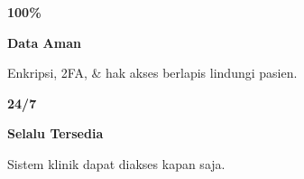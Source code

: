 \documentclass[a4paper]{article}
\begin{document}
\begin{minipage}[t]{0.485\textwidth}
    \noindent\colorbox{BlueBg}{%
        \begin{minipage}[t][2.7cm][c]{\dimexpr\linewidth-2\fboxsep\relax}
            \centering
            {\fontsize{20}{24}\selectfont\bfseries\color{BluePrimary} 100\%}\par\vspace{2pt}
            {\fontsize{9.5}{12}\selectfont\bfseries\color{BlueDark} Data Aman}\par\vspace{2pt}
            {\fontsize{8.5}{11}\selectfont\color{TextDark}Enkripsi, 2FA, \& hak akses berlapis lindungi pasien.}
        \end{minipage}}\par
    \vspace{6pt}
    \noindent\colorbox{BlueBg}{%
        \begin{minipage}[t][2.7cm][c]{\dimexpr\linewidth-2\fboxsep\relax}
            \centering
            {\fontsize{20}{24}\selectfont\bfseries\color{BluePrimary} 24/7}\par\vspace{2pt}
            {\fontsize{9.5}{12}\selectfont\bfseries\color{BlueDark} Selalu Tersedia}\par\vspace{2pt}
            {\fontsize{8.5}{11}\selectfont\color{TextDark}Sistem klinik dapat diakses kapan saja.}
        \end{minipage}}%
\end{minipage}

\vspace{8pt}
\end{document}
